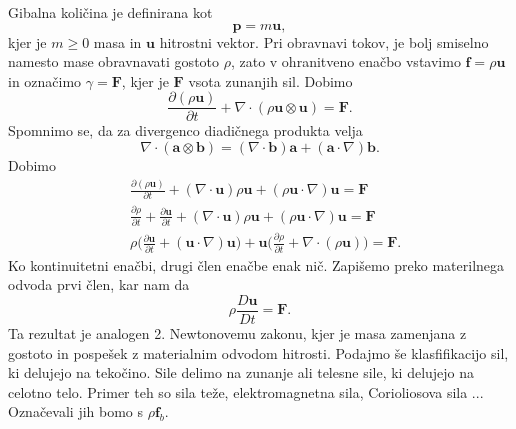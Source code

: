 \documentclass[mat2, tisk]{fmfdelo}
\newcommand{\bd}{\textbf}
\begin{document}
Gibalna količina je definirana kot
\begin{equation}
\bd{p} = m \bd{u},
\end{equation}
kjer je $m\geq 0$ masa in $\bd{u}$ hitrostni vektor. Pri obravnavi tokov, 
je bolj smiselno namesto mase obravnavati gostoto $\rho$, zato
v ohranitveno enačbo vstavimo $\bd{f} = \rho\bd{u}$ in označimo $\gamma = \bd{F}$, kjer je $\bd{F}$ vsota zunanjih sil. Dobimo
\begin{equation}
\frac{\partial (\rho \bd{u})}{\partial t} + \nabla \cdot (\rho \bd{u} \otimes \bd{u}) = \bd{F}.
\end{equation}
Spomnimo se, da za divergenco diadičnega produkta velja
\begin{equation}
\nabla \cdot (\bd{a} \otimes \bd{b}) = (\nabla \cdot \bd{b}) \bd{a} + (\bd{a} \cdot \nabla) \bd{b}.
\end{equation}
Dobimo 
\begin{align*}
&\frac{\partial (\rho \bd{u})}{\partial t} + (\nabla \cdot \bd{u}) \rho \bd{u} + (\rho \bd{u} \cdot \nabla) \bd{u} = \bd{F} \\
&\frac{\partial \rho}{\partial t} + \frac{\partial \bd{u}}{\partial t}+ (\nabla \cdot \bd{u}) \rho \bd{u} + (\rho \bd{u} \cdot \nabla) \bd{u} = \bd{F} \\
&\rho \Big(\frac{\partial \bd{u}}{\partial t} + (\bd{u} \cdot \nabla) \bd{u}\Big) + \bd{u} \Big(\frac{\partial \rho}{\partial t} + \nabla \cdot (\rho\bd{u}) \Big) = \bd{F}.
\end{align*}
Ko kontinuitetni enačbi, drugi člen enačbe enak nič. Zapišemo preko 
materilnega odvoda prvi člen, kar nam da 
\begin{equation}
\rho \frac{D \bd{u}}{D t} = \bd{F}.
\end{equation}
Ta rezultat je analogen 2. Newtonovemu zakonu, kjer je masa zamenjana z gostoto in pospešek z materialnim odvodom hitrosti.
Podajmo še klasfifikacijo sil, ki delujejo na tekočino. Sile delimo na zunanje ali telesne sile, 
ki delujejo na celotno telo. Primer teh so sila teže, elektromagnetna sila, 
Corioliosova sila ... Označevali jih bomo s $\rho \bd{f}_b$. 
\end{document}
